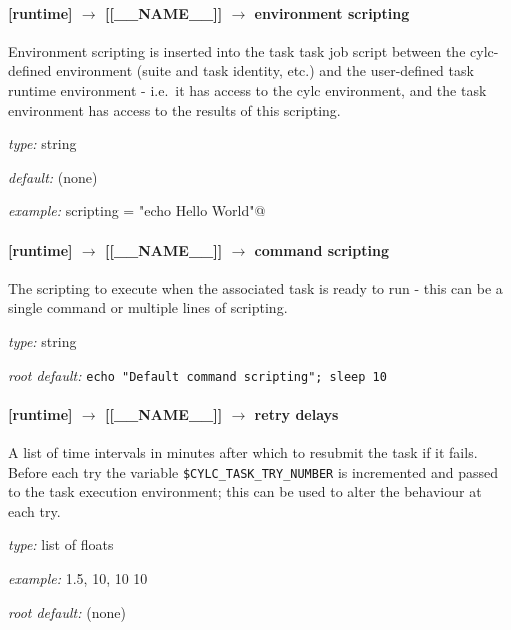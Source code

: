 \paragraph[environment scripting]{[runtime] $\rightarrow$ [[\_\_NAME\_\_]] $\rightarrow$ environment scripting}

Environment scripting is inserted into the task task job script between
the cylc-defined environment (suite and task identity, etc.) and the 
user-defined task runtime environment - i.e.\ it has access to the 
cylc environment, and the task environment has access to the results of
this scripting.
\begin{myitemize}
\item {\em type:} string
\item {\em default:} (none)
\item {\em example:} \lstinline@environment scripting = "echo Hello World"@
\end{myitemize}

\paragraph[command scripting]{[runtime] $\rightarrow$ [[\_\_NAME\_\_]] $\rightarrow$ command scripting}

The scripting to execute when the associated task is ready to run - this
can be a single command or multiple lines of scripting. 

\begin{myitemize}
\item {\em type:} string
\item {\em root default:} \lstinline=echo "Default command scripting"; sleep 10=
\end{myitemize}


\paragraph[retry delays]{[runtime] $\rightarrow$ [[\_\_NAME\_\_]] $\rightarrow$ retry delays}
\label{RefRetries}

A list of time intervals in minutes after which to resubmit the task if it 
fails. Before each try the variable \lstinline=$CYLC_TASK_TRY_NUMBER= is
incremented and passed to the task execution environment; this can be
used to alter the behaviour at each try.

\begin{myitemize}
\item {\em type:} list of floats
\item {\em example:} 1.5, 10, 10 10
\item {\em root default:} (none)
\end{myitemize}



